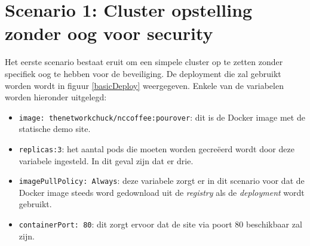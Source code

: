 \clearpage
\section{Scenario 1: Cluster opstelling zonder oog voor security}

Het eerste scenario bestaat eruit om een simpele cluster op te zetten zonder specifiek oog te hebben voor de beveiliging. De deployment die zal gebruikt worden wordt in figuur \ref{basicDeploy} weergegeven. Enkele van de variabelen worden hieronder uitgelegd: 
\begin{itemize}
	\item \verb|image: thenetworkchuck/nccoffee:pourover|: dit is de Docker image met de statische demo site.
	\item \verb|replicas:3|: het aantal pods die moeten worden gecreëerd wordt door deze variabele ingesteld. In dit geval zijn dat er drie.
	\item \verb|imagePullPolicy: Always|: deze variabele zorgt er in dit scenario voor dat de Docker image steeds word gedownload uit de \textit{registry} als de \textit{deployment} wordt gebruikt.
	\item \verb|containerPort: 80|: dit zorgt ervoor dat de site via poort 80 beschikbaar zal zijn.
\end{itemize}

